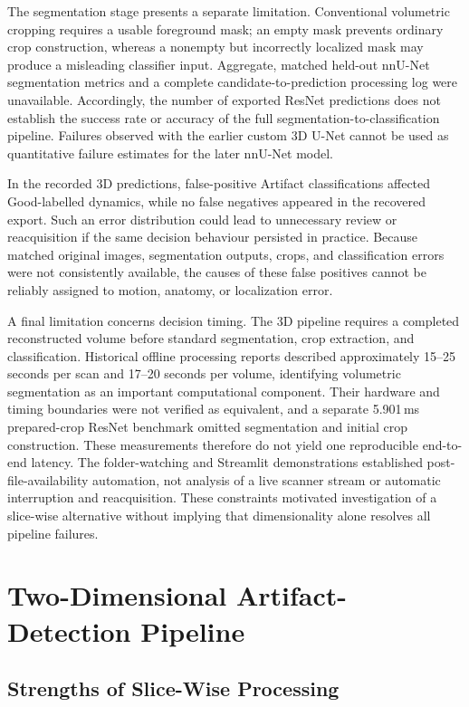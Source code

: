The segmentation stage presents a separate limitation. Conventional volumetric cropping requires a usable foreground mask; an empty mask prevents ordinary crop construction, whereas a nonempty but incorrectly localized mask may produce a misleading classifier input. Aggregate, matched held-out nnU-Net segmentation metrics and a complete candidate-to-prediction processing log were unavailable. Accordingly, the number of exported ResNet predictions does not establish the success rate or accuracy of the full segmentation-to-classification pipeline. Failures observed with the earlier custom 3D U-Net cannot be used as quantitative failure estimates for the later nnU-Net model.

In the recorded 3D predictions, false-positive Artifact classifications affected Good-labelled dynamics, while no false negatives appeared in the recovered export. Such an error distribution could lead to unnecessary review or reacquisition if the same decision behaviour persisted in practice. Because matched original images, segmentation outputs, crops, and classification errors were not consistently available, the causes of these false positives cannot be reliably assigned to motion, anatomy, or localization error.

A final limitation concerns decision timing. The 3D pipeline requires a completed reconstructed volume before standard segmentation, crop extraction, and classification. Historical offline processing reports described approximately 15--25 seconds per scan and 17--20 seconds per volume, identifying volumetric segmentation as an important computational component. Their hardware and timing boundaries were not verified as equivalent, and a separate 5.901\,ms prepared-crop ResNet benchmark omitted segmentation and initial crop construction. These measurements therefore do not yield one reproducible end-to-end latency. The folder-watching and Streamlit demonstrations established post-file-availability automation, not analysis of a live scanner stream or automatic interruption and reacquisition. These constraints motivated investigation of a slice-wise alternative without implying that dimensionality alone resolves all pipeline failures.

\section{Two-Dimensional Artifact-Detection Pipeline}
\label{sec:discussion_2d}

\subsection{Strengths of Slice-Wise Processing}
\label{subsec:discussion_2d_strengths}


